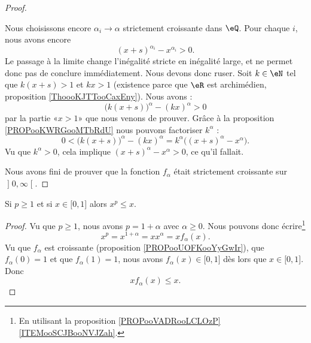 \begin{proof}
\begin{subproof}
		\spitem[\(0< x\leq 1\)]
		Nous choisissons encore \( \alpha_i\to \alpha\) strictement croissante dans \( \eQ\). Pour chaque \( i\), nous avons encore
		\begin{equation}
			(x+s)^{\alpha_i}-x^{\alpha_i}>0.
		\end{equation}
		Le passage à la limite change l'inégalité stricte en inégalité large, et ne permet donc pas de conclure immédiatement. Nous devons donc ruser. Soit \( k\in \eN\) tel que \( k(x+s)>1\) et \( kx>1\) (existence parce que \( \eR\) est archimédien, proposition \ref{ThoooKJTTooCaxEny}). Nous avons :
		\begin{equation}
			\big( k(x+s) \big)^{\alpha}-(kx)^{\alpha}>0
		\end{equation}
		par la partie «\( x>1\)» que nous venons de prouver. Grâce à la proposition \ref{PROPooKWRGooMTbRdU} nous pouvons factoriser \( k^{\alpha}\) :
		\begin{equation}
			0<\big( k(x+s) \big)^{\alpha}-(kx)^{\alpha}=k^{\alpha}\big( (x+s)^{\alpha}-x^{\alpha} \big).
		\end{equation}
		Vu que \( k^{\alpha}>0\), cela implique \( (x+s)^{\alpha}-x^{\alpha}>0\), ce qu'il fallait.
	\end{subproof}
	Nous avons fini de prouver que la fonction \( f_{\alpha}\) était strictement croissante sur \( \mathopen] 0 , \infty \mathclose[\).
\end{proof}

\begin{lemma}       \label{LEMooJVXQooDPUuuJ}
	Si \( p\geq 1\) et si \( x\in \mathopen[ 0 , 1 \mathclose]\) alors \( x^p\leq x\).
\end{lemma}

\begin{proof}
	Vu que \( p\geq 1\), nous avons \( p=1+\alpha\) avec \( \alpha\geq 0\). Nous pouvons donc écrire\footnote{En utilisant la proposition \ref{PROPooVADRooLCLOzP}\ref{ITEMooSCJBooNVJZah}.}
	\begin{equation}
		x^p=x^{1+\alpha}=xx^{\alpha}=xf_{\alpha}(x).
	\end{equation}
	Vu que \( f_{\alpha}\) est croissante (proposition \ref{PROPooUOFKooYyGwIr}), que \( f_{\alpha}(0)=1\) et que \( f_{\alpha}(1)=1\), nous avons \( f_{\alpha}(x)\in\mathopen[ 0 , 1 \mathclose]\) dès lors que \( x\in\mathopen[ 0 , 1 \mathclose]\). Donc
	\begin{equation}
		xf_{\alpha}(x)\leq x.
	\end{equation}
\end{proof}

